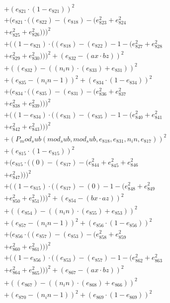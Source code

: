 \documentclass[10pt, a4paper]{article}
\begin{document}
\begin{small}
\begin{align*}
& + (e_{821}  \cdot  (1 - e_{821}))^{2} \\
& + (e_{821}  \cdot  ((e_{822}) - (e_{818}) - (e_{823}^{2} + e_{824}^{2} \\
& + e_{825}^{2} + e_{826}^{2})))^{2} \\
& + ((1 - e_{821})  \cdot  ((e_{818}) - (e_{822}) - 1 - (e_{827}^{2} + e_{828}^{2} \\
& + e_{829}^{2} + e_{830}^{2})))^{2} + (e_{832} - (ax  \cdot  bz))^{2} \\
& + ((e_{832}) - ((n_in)  \cdot  (e_{833}) + e_{831}))^{2} \\
& + (e_{835} - (n_in - 1))^{2} + (e_{834}  \cdot  (1 - e_{834}))^{2} \\
& + (e_{834}  \cdot  ((e_{835}) - (e_{831}) - (e_{836}^{2} + e_{837}^{2} \\
& + e_{838}^{2} + e_{839}^{2})))^{2} \\
& + ((1 - e_{834})  \cdot  ((e_{831}) - (e_{835}) - 1 - (e_{840}^{2} + e_{841}^{2} \\
& + e_{842}^{2} + e_{843}^{2})))^{2} \\
& + (P_mod_sub(mod_sub, mod_sub, e_{818}, e_{831}, n_in, e_{817}))^{2} \\
& + (e_{815}  \cdot  (1 - e_{815}))^{2} \\
& + (e_{815}  \cdot  ((0) - (e_{817}) - (e_{844}^{2} + e_{845}^{2} + e_{846}^{2} \\
& + e_{847}^{2})))^{2} \\
& + ((1 - e_{815})  \cdot  ((e_{817}) - (0) - 1 - (e_{848}^{2} + e_{849}^{2} \\
& + e_{850}^{2} + e_{851}^{2})))^{2} + (e_{854} - (bx  \cdot  az))^{2} \\
& + ((e_{854}) - ((n_in)  \cdot  (e_{855}) + e_{853}))^{2} \\
& + (e_{857} - (n_in - 1))^{2} + (e_{856}  \cdot  (1 - e_{856}))^{2} \\
& + (e_{856}  \cdot  ((e_{857}) - (e_{853}) - (e_{858}^{2} + e_{859}^{2} \\
& + e_{860}^{2} + e_{861}^{2})))^{2} \\
& + ((1 - e_{856})  \cdot  ((e_{853}) - (e_{857}) - 1 - (e_{862}^{2} + e_{863}^{2} \\
& + e_{864}^{2} + e_{865}^{2})))^{2} + (e_{867} - (ax  \cdot  bz))^{2} \\
& + ((e_{867}) - ((n_in)  \cdot  (e_{868}) + e_{866}))^{2} \\
& + (e_{870} - (n_in - 1))^{2} + (e_{869}  \cdot  (1 - e_{869}))^{2} \\

\end{align*}
\end{small}
\end{document}
